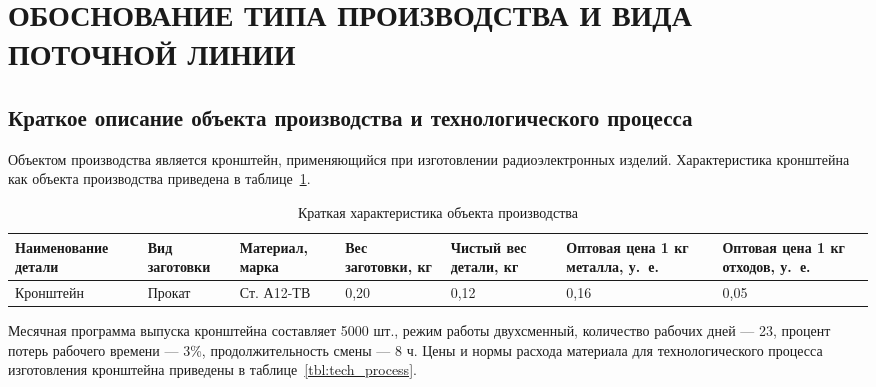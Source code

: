 \section[Обоснование типа производства и вида поточной линии]{
  ОБОСНОВАНИЕ ТИПА ПРОИЗВОДСТВА И ВИДА \\
  ПОТОЧНОЙ ЛИНИИ
}
\label{sec:choice}

\subsection[
Краткое описание объекта производства и технологического \\
процесса
]{
  Краткое описание объекта производства и 
  технологического процесса
}

Объектом производства является кронштейн,
применяющийся при изготовлении радиоэлектронных изделий.
Характеристика кронштейна как объекта производства приведена
в таблице~\ref{tbl:piece_description}.

\begin{table} [h!]
  \caption{
    Краткая характеристика объекта производства
  }\label{tbl:piece_description}
  {\small
    \begin{tabular}{| m{2.7cm} | m{1.7cm} | m{2.1cm} | m{1.9cm} | m{1.4cm} | m{1.8cm} | m{1.8cm} |}
      \hline
      Наименование детали & Вид заготовки & Материал, марка
      & Вес заготовки, кг & Чистый вес детали, кг
      & Оптовая цена 1 кг металла, у.~е. & Оптовая цена 1 кг отходов, у.~е. \\
      \hline
      Кронштейн & Прокат & Ст. А12-ТВ
      & 0{,}20 & 0{,}12 
      & 0{,}16 & 0{,}05 \\
      \hline
    \end{tabular}
  }
\end{table}

Месячная программа выпуска кронштейна составляет 5000 шт.,
режим работы двухсменный, количество рабочих дней --- 23,
процент потерь рабочего времени --- 3\%, продолжительность смены --- 8 ч.
Цены и нормы расхода материала для технологического 
процесса изготовления кронштейна приведены в таблице~\ref{tbl:tech_process}.

